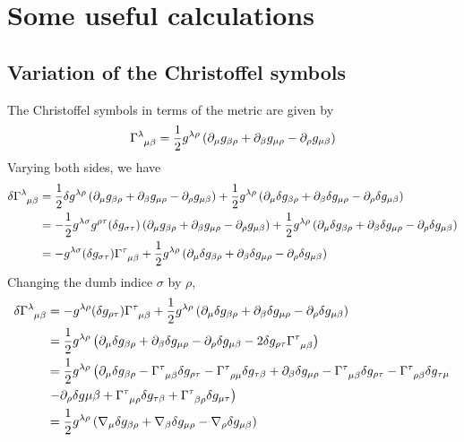 \section{Some useful calculations}
\subsection{Variation of the Christoffel symbols}
The Christoffel symbols in terms of the metric are given by
\begin{equation*}
    \tensor{\Gamma}{^\lambda_{\mu\beta}}=\frac{1}{2}g^{\lambda\rho}\left(\partial_\mu g_{\beta\rho}+\partial_\beta g_{\mu\rho}-\partial_\rho g_{\mu\beta}\right)
\end{equation*}
Varying both sides, we have
\begin{align*}
    \delta\tensor{\Gamma}{^\lambda_{\mu\beta}}&=\frac{1}{2}\delta g^{\lambda\rho}\left(\partial_\mu g_{\beta\rho}+\partial_\beta g_{\mu\rho}-\partial_\rho g_{\mu\beta}\right)+\frac{1}{2}g^{\lambda\rho}\left(\partial_\mu \delta g_{\beta\rho}+\partial_\beta \delta g_{\mu\rho}-\partial_\rho \delta g_{\mu\beta}\right)\\
    &=-\frac{1}{2}g^{\lambda\sigma}g^{\rho\tau}(\delta g_{\sigma\tau})\left(\partial_\mu g_{\beta\rho}+\partial_\beta g_{\mu\rho}-\partial_\rho g_{\mu\beta}\right)+\frac{1}{2}g^{\lambda\rho}\left(\partial_\mu\delta g_{\beta\rho}+\partial_\beta \delta g_{\mu\rho}-\partial_\rho\delta g_{\mu\beta}\right)\\
    &=-g^{\lambda\sigma}(\delta g_{\sigma\tau})\tensor{\Gamma}{^\tau_{\mu\beta}}+\frac{1}{2}g^{\lambda\rho}\left(\partial_\mu\delta g_{\beta\rho}+\partial_\beta \delta g_{\mu\rho}-\partial_\rho\delta g_{\mu\beta}\right)
\end{align*}
Changing the dumb indice $\sigma$ by $\rho$,
\begin{align}
    \nonumber\delta\tensor{\Gamma}{^\lambda_{\mu\beta}}&=-g^{\lambda\rho}(\delta g_{\rho\tau})\tensor{\Gamma}{^\tau_{\mu\beta}}+\frac{1}{2}g^{\lambda\rho}\left(\partial_\mu\delta g_{\beta\rho}+\partial_\beta \delta g_{\mu\rho}-\partial_\rho\delta g_{\mu\beta}\right)\\
   \nonumber &=\frac{1}{2} g^{\lambda\rho}\left(\partial_\mu \delta g_{\beta\rho}+\partial_\beta \delta g_{\mu\rho}-\partial_\rho\delta g_{\mu\beta}-2\delta g_{\rho\tau}\tensor{\Gamma}{^\tau_{\mu\beta}}\right)\\
   \nonumber &=\frac{1}{2}g^{\lambda\rho}\left(\partial_\mu \delta g_{\beta\rho}-\tensor{\Gamma}{^\tau_{\mu\beta}}\delta g_{\rho\tau}-\tensor{\Gamma}{^\tau_{\rho\mu}}\delta g_{\tau\beta}+\partial_\beta \delta g_{\mu\rho}-\tensor{\Gamma}{^\tau_{\mu\beta}}\delta g_{\rho\tau}-\tensor{\Gamma}{^\tau_{\rho\beta}}\delta g_{\tau\mu}\right.\\\nonumber &\left.-\partial_\rho \delta g{\mu\beta}+\tensor{\Gamma}{^\tau_{\mu\rho}}\delta g_{\tau\beta}+\tensor{\Gamma}{^\tau_{\beta\rho}}\delta g_{\mu\tau}\right)\\
    &=\frac{1}{2}g^{\lambda\rho}\left(\nabla_\mu \delta g_{\beta\rho}+\nabla_\beta \delta g_{\mu\rho}-\nabla_\rho \delta g_{\mu\beta}\right)\label{delta Gamma}
\end{align}


